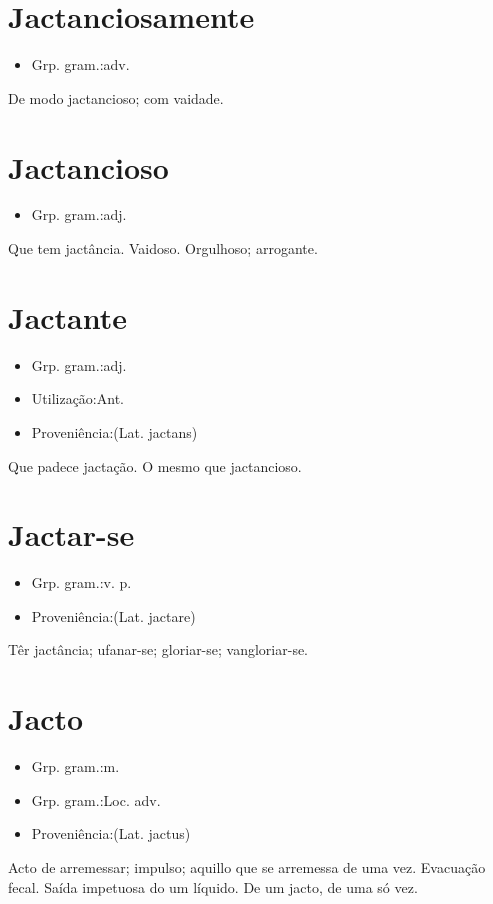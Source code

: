 \documentclass{article}
\begin{document}
\section{Jactanciosamente}
\begin{itemize}
\item {Grp. gram.:adv.}
\end{itemize}
De modo jactancioso; com vaidade.
\section{Jactancioso}
\begin{itemize}
\item {Grp. gram.:adj.}
\end{itemize}
Que tem jactância.
Vaidoso.
Orgulhoso; arrogante.
\section{Jactante}
\begin{itemize}
\item {Grp. gram.:adj.}
\end{itemize}
\begin{itemize}
\item {Utilização:Ant.}
\end{itemize}
\begin{itemize}
\item {Proveniência:(Lat. \textunderscore jactans\textunderscore )}
\end{itemize}
Que padece jactação.
O mesmo que \textunderscore jactancioso\textunderscore .
\section{Jactar-se}
\begin{itemize}
\item {Grp. gram.:v. p.}
\end{itemize}
\begin{itemize}
\item {Proveniência:(Lat. \textunderscore jactare\textunderscore )}
\end{itemize}
Têr jactância; ufanar-se; gloriar-se; vangloriar-se.
\section{Jacto}
\begin{itemize}
\item {Grp. gram.:m.}
\end{itemize}
\begin{itemize}
\item {Grp. gram.:Loc. adv.}
\end{itemize}
\begin{itemize}
\item {Proveniência:(Lat. \textunderscore jactus\textunderscore )}
\end{itemize}
Acto de arremessar; impulso; aquillo que se arremessa de uma vez.
Evacuação fecal.
Saída impetuosa do um líquido.
\textunderscore De um jacto\textunderscore , de uma só vez.
\end{document}
